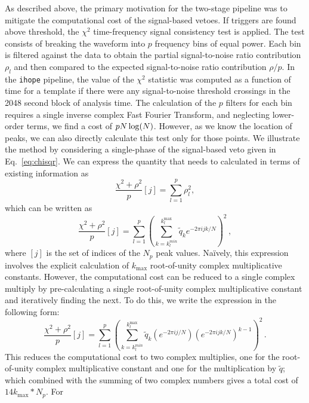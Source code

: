 \documentclass[12pt]{iopart} \usepackage{graphicx,amssymb}
\begin{document}
As described above, the primary motivation for the two-stage pipeline was to
mitigate the computational cost of the signal-based vetoes.  If triggers are
found above threshold, the $\chi^2$ time-frequency signal consistency test is
applied.  The test consists of breaking the waveform into $p$ frequency bins
of equal power. Each bin is filtered against the data to obtain the partial
signal-to-noise ratio contribution $\rho_l$ and then compared to the expected 
signal-to-noise ratio contribution $\rho/p$. 
In the \texttt{ihope} pipeline, the value of the $\chi^2$ statistic was
computed as a function of time for a template if there were any
signal-to-noise threshold crossings in the 2048 second block of analysis time.
The calculation of the $p$ filters for each bin requires a single inverse
complex Fast Fourier Transform, and neglecting lower-order terms, we find a
cost of $p \time 5 N \log(N)$.  However, as we know the location of peaks, we
can also directly calculate this test only for those points. We illustrate the
method by considering a single-phase of the signal-based veto given in
Eq.~\ref{eq:chisqr}. We can express
the quantity that needs to calculated in terms of existing information as
%
\begin{equation}
\frac{\chi^2 + \rho^2}{p}[j] = \sum_{l=1}^{p}\rho_l^2,
\end{equation}
%
which can be written as
%
\begin{equation}
\frac{\chi^2 + \rho^2}{p}[j] = \sum_{l=1}^{p}\left(\sum_{k=k^{min}_l}^{k^\mathrm{max}_l}\tilde{q}_k e^{-2\pi i jk/N}\right)^2\, ,
\end{equation}
%
where $[j]$ is the set of indices of the $N_p$ peak values. Na{\"i}vely, this
expression involves the explicit calculation of $k_\mathrm{max}$ root-of-unity 
complex multiplicative constants. However, the computational cost can be 
reduced to a single complex multiply by pre-calculating a single root-of-unity 
complex multiplicative constant and iteratively finding the next. To do this, 
we write the expression in the following form:
\begin{equation}
\frac{\chi^2 + \rho^2}{p}[j] = \sum_{l=1}^{p}\left(\sum_{k=k^{min}_l}^{k^\mathrm{max}_l}\tilde{q}_k (e^{-2\pi ij/N}) (e^{-2\pi ijk/N})^{k-1}\right)^2 \, .
\end{equation}
This reduces the computational cost to two complex multiplies, one for the 
root-of-unity complex multiplicative constant and one for the multiplication 
by $\tilde{q}$; which combined with the summing of two complex numbers gives a 
total cost of $14 k_\mathrm{max} * N_p$. For
\end{document}
